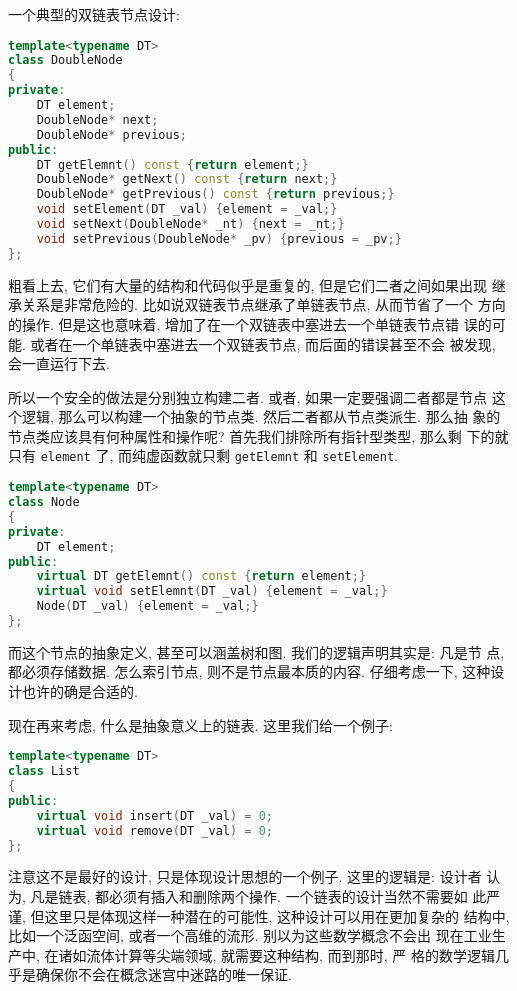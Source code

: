 \documentclass[a4paper]{ctexart}
\theoremstyle{definition}
\theoremstyle{definition}
\begin{document}
一个典型的双链表节点设计:

\begin{lstlisting}[language=C++]
template<typename DT>
class DoubleNode
{
private:
    DT element;
    DoubleNode* next;
    DoubleNode* previous;
public:
    DT getElemnt() const {return element;}
    DoubleNode* getNext() const {return next;}
    DoubleNode* getPrevious() const {return previous;}
    void setElement(DT _val) {element = _val;}
    void setNext(DoubleNode* _nt) {next = _nt;}
    void setPrevious(DoubleNode* _pv) {previous = _pv;}
};
\end{lstlisting}

粗看上去, 它们有大量的结构和代码似乎是重复的, 但是它们二者之间如果出现
继承关系是非常危险的. 比如说双链表节点继承了单链表节点, 从而节省了一个
方向的操作. 但是这也意味着, 增加了在一个双链表中塞进去一个单链表节点错
误的可能. 或者在一个单链表中塞进去一个双链表节点, 而后面的错误甚至不会
被发现, 会一直运行下去. 

所以一个安全的做法是分别独立构建二者. 或者, 如果一定要强调二者都是节点
这个逻辑, 那么可以构建一个抽象的节点类. 然后二者都从节点类派生. 那么抽
象的节点类应该具有何种属性和操作呢? 首先我们排除所有指针型类型, 那么剩
下的就只有 \verb|element| 了, 而纯虚函数就只剩 \verb|getElemnt| 和
\verb|setElement|.

\begin{lstlisting}[language=C++]
template<typename DT>
class Node
{
private:
    DT element;
public:
    virtual DT getElemnt() const {return element;}
    virtual void setElemnt(DT _val) {element = _val;}
    Node(DT _val) {element = _val;}
};
\end{lstlisting}

而这个节点的抽象定义, 甚至可以涵盖树和图. 我们的逻辑声明其实是: 凡是节
点, 都必须存储数据. 怎么索引节点, 则不是节点最本质的内容. 仔细考虑一下,
这种设计也许的确是合适的.

现在再来考虑, 什么是抽象意义上的链表. 这里我们给一个例子:

\begin{lstlisting}[language=C++]
template<typename DT>
class List
{
public:
    virtual void insert(DT _val) = 0;
    virtual void remove(DT _val) = 0;
};
\end{lstlisting}

注意这不是最好的设计, 只是体现设计思想的一个例子. 这里的逻辑是: 设计者
认为, 凡是链表, 都必须有插入和删除两个操作. 一个链表的设计当然不需要如
此严谨, 但这里只是体现这样一种潜在的可能性, 这种设计可以用在更加复杂的
结构中, 比如一个泛函空间, 或者一个高维的流形. 别以为这些数学概念不会出
现在工业生产中, 在诸如流体计算等尖端领域, 就需要这种结构, 而到那时, 严
格的数学逻辑几乎是确保你不会在概念迷宫中迷路的唯一保证.
\end{document}
